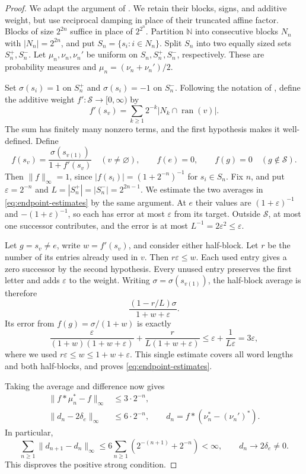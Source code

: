 \documentclass[11pt,letterpaper]{amsart}
\theoremstyle{definition}
\theoremstyle{remark}
\newcommand{\N}{\mathbb N}
\DeclareMathOperator{\ran}{ran}
\begin{document}
\begin{proof}
We adapt the argument of \cite[Example~5.5, Claim~2]{DD}. We retain
their blocks, signs, and additive weight, but use reciprocal damping
in place of their truncated affine factor. Blocks of size $2^{2n}$
suffice in place of $2^{2^n}$.
Partition $\N$ into consecutive blocks $N_n$ with $|N_n|=2^{2n}$,
and put $S_n=\{s_i:i\in N_n\}$. Split $S_n$ into two equally sized
sets $S_n^+,S_n^-$. Let $\mu_n,\nu_n,\nu_n'$ be uniform on
$S_n,S_n^+,S_n^-$, respectively. These are probability measures and
$\mu_n=(\nu_n+\nu_n')/2$.

Set $\sigma(s_i)=1$ on $S_n^+$ and $\sigma(s_i)=-1$ on $S_n^-$.
Following the notation of \cite{DD}, define the additive weight
$f':\mathcal S\to[0,\infty)$ by
\[
 f'(s_v)=\sum_{k\geq1}2^{-k}|N_k\cap\ran(v)|.
\]
The sum has finitely many nonzero terms, and the first hypothesis
makes it well-defined. Define
\[
 f(s_v)=\frac{\sigma(s_{v(1)})}{1+f'(s_v)}
   \quad(v\ne\varnothing),\qquad
 f(e)=0,\qquad
 f(g)=0\quad(g\notin\mathcal S).
\]
Then $\|f\|_\infty=1$, since $|f(s_i)|=(1+2^{-n})^{-1}$ for $s_i\in S_n$.
Fix $n$, and put $\varepsilon=2^{-n}$ and
$L=|S_n^+|=|S_n^-|=2^{2n-1}$. We estimate the two averages in
\eqref{eq:endpoint-estimates} by the same argument.
At $e$ their values are $(1+\varepsilon)^{-1}$ and
$-(1+\varepsilon)^{-1}$, so each has error at most $\varepsilon$
from its target. Outside $\mathcal S$,
at most one successor contributes, and the error is at most
$L^{-1}=2\varepsilon^2\leq\varepsilon$.

Let $g=s_v\ne e$, write $w=f'(s_v)$, and consider either half-block.
Let $r$ be the number of its entries already used in $v$. Then
$r\varepsilon\leq w$. Each used entry gives a zero successor by the
second hypothesis. Every unused entry preserves the first letter and
adds $\varepsilon$ to the weight. Writing
$\sigma=\sigma(s_{v(1)})$, the half-block average is therefore
\[
 \frac{(1-r/L)\sigma}{1+w+\varepsilon}.
\]
Its error from $f(g)=\sigma/(1+w)$ is exactly
\[
 \frac{\varepsilon}{(1+w)(1+w+\varepsilon)}
 +\frac{r}{L(1+w+\varepsilon)}
 \leq\varepsilon+\frac1{L\varepsilon}=3\varepsilon,
\]
where we used $r\varepsilon\leq w\leq1+w+\varepsilon$.
This single estimate covers all word lengths and both half-blocks,
and proves \eqref{eq:endpoint-estimates}.

Taking the average and difference now gives
\begin{align}
 \|f*\mu_n^*-f\|_\infty&\leq3\cdot2^{-n},\label{eq:main-approx}\\
 \|d_n-2\delta_e\|_\infty&\leq6\cdot2^{-n},
 \qquad d_n=f*(\nu_n^*-(\nu_n')^*).\label{eq:main-split}
\end{align}
In particular,
\[
 \sum_{n\geq1}\|d_{n+1}-d_n\|_\infty
 \leq6\sum_{n\geq1}(2^{-(n+1)}+2^{-n})<\infty,
 \qquad d_n\longrightarrow2\delta_e\ne0.
\]
This disproves the positive strong condition.


\end{proof}
\end{document}
